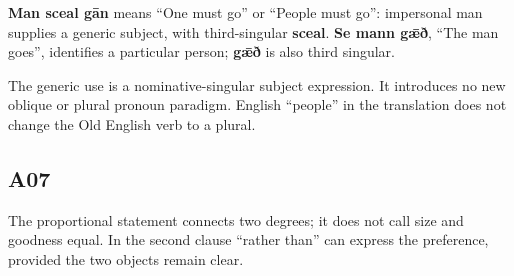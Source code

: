 \par\begin{minipage}{\linewidth}\raggedright
\textbf{Man sceal gān} means “One must go” or “People must go”: impersonal man supplies a generic subject, with third-singular \textbf{sceal}. \textbf{Se mann gǣð}, “The man goes”, identifies a particular person; \textbf{gǣð} is also third singular.

The generic use is a nominative-singular subject expression. It introduces no new oblique or plural pronoun paradigm. English “people” in the translation does not change the Old English verb to a plural.

\end{minipage}\par\addvspace{4pt}

\subsection*{A07}

\par\begin{minipage}{\linewidth}\raggedright



The proportional statement connects two degrees; it does not call size and goodness equal. In the second clause “rather than” can express the preference, provided the two objects remain clear.

\end{minipage}\par\addvspace{4pt}

